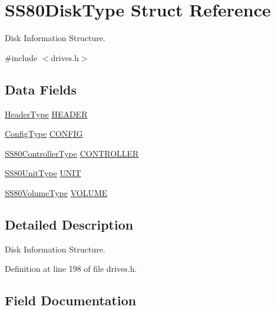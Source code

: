 \hypertarget{structSS80DiskType}{}\section{S\+S80\+Disk\+Type Struct Reference}
\label{structSS80DiskType}


Disk Information Structure.  




{\ttfamily \#include $<$drives.\+h$>$}

\subsection*{Data Fields}
\begin{DoxyCompactItemize}
\item 
\hyperlink{structHeaderType}{Header\+Type} \hyperlink{structSS80DiskType_ae66c0130dee8c362743dfdfc41539c3b}{H\+E\+A\+D\+ER}
\item 
\hyperlink{structConfigType}{Config\+Type} \hyperlink{structSS80DiskType_aeff2b9e1dcd95310e9e8dee63a60ed95}{C\+O\+N\+F\+IG}
\item 
\hyperlink{structSS80ControllerType}{S\+S80\+Controller\+Type} \hyperlink{structSS80DiskType_ae9da84cba5786cf755c388eba065c0cd}{C\+O\+N\+T\+R\+O\+L\+L\+ER}
\item 
\hyperlink{structSS80UnitType}{S\+S80\+Unit\+Type} \hyperlink{structSS80DiskType_ac630da1440afd60d726c7c41eb7b990c}{U\+N\+IT}
\item 
\hyperlink{structSS80VolumeType}{S\+S80\+Volume\+Type} \hyperlink{structSS80DiskType_adef69576dbc48a5d70ff628578d77b60}{V\+O\+L\+U\+ME}
\end{DoxyCompactItemize}


\subsection{Detailed Description}
Disk Information Structure. 

Definition at line 198 of file drives.\+h.



\subsection{Field Documentation}
\mbox{\label{structSS80DiskType_aeff2b9e1dcd95310e9e8dee63a60ed95}} 
